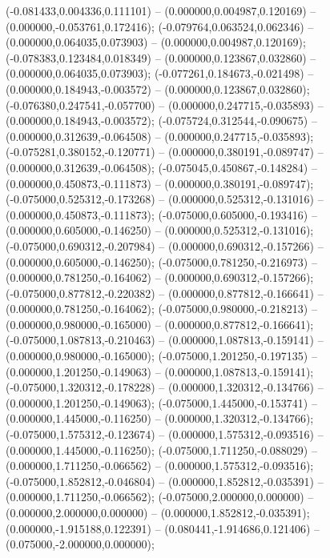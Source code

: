  (-0.081433,0.004336,0.111101) -- (0.000000,0.004987,0.120169) -- (0.000000,-0.053761,0.172416);
 (-0.079764,0.063524,0.062346) -- (0.000000,0.064035,0.073903) -- (0.000000,0.004987,0.120169);
 (-0.078383,0.123484,0.018349) -- (0.000000,0.123867,0.032860) -- (0.000000,0.064035,0.073903);
 (-0.077261,0.184673,-0.021498) -- (0.000000,0.184943,-0.003572) -- (0.000000,0.123867,0.032860);
 (-0.076380,0.247541,-0.057700) -- (0.000000,0.247715,-0.035893) -- (0.000000,0.184943,-0.003572);
 (-0.075724,0.312544,-0.090675) -- (0.000000,0.312639,-0.064508) -- (0.000000,0.247715,-0.035893);
 (-0.075281,0.380152,-0.120771) -- (0.000000,0.380191,-0.089747) -- (0.000000,0.312639,-0.064508);
 (-0.075045,0.450867,-0.148284) -- (0.000000,0.450873,-0.111873) -- (0.000000,0.380191,-0.089747);
 (-0.075000,0.525312,-0.173268) -- (0.000000,0.525312,-0.131016) -- (0.000000,0.450873,-0.111873);
 (-0.075000,0.605000,-0.193416) -- (0.000000,0.605000,-0.146250) -- (0.000000,0.525312,-0.131016);
 (-0.075000,0.690312,-0.207984) -- (0.000000,0.690312,-0.157266) -- (0.000000,0.605000,-0.146250);
 (-0.075000,0.781250,-0.216973) -- (0.000000,0.781250,-0.164062) -- (0.000000,0.690312,-0.157266);
 (-0.075000,0.877812,-0.220382) -- (0.000000,0.877812,-0.166641) -- (0.000000,0.781250,-0.164062);
 (-0.075000,0.980000,-0.218213) -- (0.000000,0.980000,-0.165000) -- (0.000000,0.877812,-0.166641);
 (-0.075000,1.087813,-0.210463) -- (0.000000,1.087813,-0.159141) -- (0.000000,0.980000,-0.165000);
 (-0.075000,1.201250,-0.197135) -- (0.000000,1.201250,-0.149063) -- (0.000000,1.087813,-0.159141);
 (-0.075000,1.320312,-0.178228) -- (0.000000,1.320312,-0.134766) -- (0.000000,1.201250,-0.149063);
 (-0.075000,1.445000,-0.153741) -- (0.000000,1.445000,-0.116250) -- (0.000000,1.320312,-0.134766);
 (-0.075000,1.575312,-0.123674) -- (0.000000,1.575312,-0.093516) -- (0.000000,1.445000,-0.116250);
 (-0.075000,1.711250,-0.088029) -- (0.000000,1.711250,-0.066562) -- (0.000000,1.575312,-0.093516);
 (-0.075000,1.852812,-0.046804) -- (0.000000,1.852812,-0.035391) -- (0.000000,1.711250,-0.066562);
 (-0.075000,2.000000,0.000000) -- (0.000000,2.000000,0.000000) -- (0.000000,1.852812,-0.035391);
 (0.000000,-1.915188,0.122391) -- (0.080441,-1.914686,0.121406) -- (0.075000,-2.000000,0.000000);
